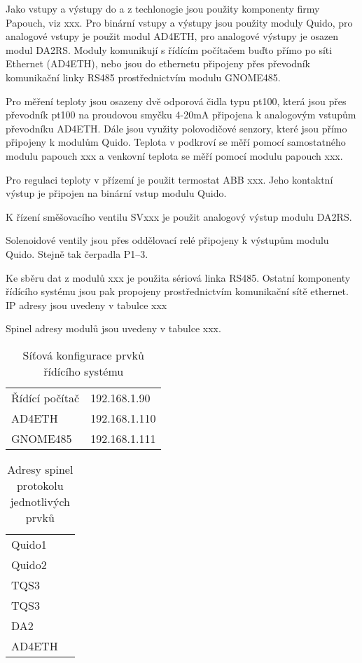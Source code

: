\documentclass{book}
\begin{document}
    Jako vstupy a výstupy do a z techlonogie jsou použity komponenty firmy
    Papouch, viz xxx. Pro binární vstupy a výstupy jsou použity moduly Quido,
    pro analogové vstupy je použit modul AD4ETH, pro analogové výstupy je
    osazen modul DA2RS. Moduly komunikují s řídícím počítačem buďto přímo
    po síti Ethernet (AD4ETH), nebo jsou do ethernetu připojeny přes převodník
    komunikační linky RS485 prostřednictvím modulu GNOME485.

    Pro měření teploty jsou osazeny dvě odporová čidla typu pt100, která jsou
    přes převodník pt100 na proudovou smyčku 4-20mA připojena k analogovým
    vstupům převodníku AD4ETH. Dále jsou využity polovodičové senzory, které
    jsou přímo připojeny k modulům Quido. Teplota v podkroví se měří pomocí
    samostatného modulu papouch xxx a venkovní teplota se měří pomocí modulu
    papouch xxx.

    Pro regulaci teploty v přízemí je použit termostat ABB xxx. Jeho kontaktní
    výstup je připojen na binární vstup modulu Quido.

    K řízení směšovacího ventilu SVxxx je použit analogový výstup modulu DA2RS.

    Solenoidové ventily jsou přes oddělovací relé připojeny k výstupům modulu
    Quido. Stejně tak čerpadla P1--3.

    Ke sběru dat z modulů xxx je použita sériová linka RS485. Ostatní komponenty
    řídícího systému jsou pak propojeny prostřednictvím komunikační sítě
    ethernet. IP adresy jsou uvedeny v tabulce xxx

    Spinel adresy modulů jsou uvedeny v tabulce xxx.

    \begin{table}
      \centering
      \begin{tabular}{ll}
        Řídící počítač & 192.168.1.90 \\
        AD4ETH         & 192.168.1.110\\
        GNOME485       & 192.168.1.111\\
      \end{tabular}
      \caption{Síťová konfigurace prvků řídícího systému}
    \end{table}

    \begin{table}
      \centering
      \begin{tabular}{ll}
        Quido1 & \\
        Quido2 & \\
        TQS3   & \\
        TQS3   & \\
        DA2    & \\
        AD4ETH &
      \end{tabular}
      \caption{Adresy spinel protokolu jednotlivých prvků}
    \end{table}
\end{document}
